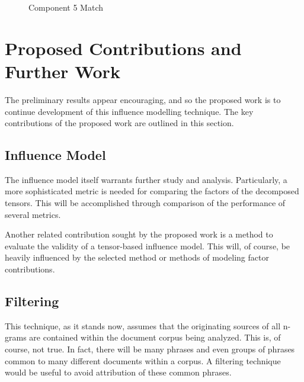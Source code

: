 \documentclass{article}
\begin{document}
\begin{figure}%
    \centering
    \qquad
    \caption{Component 5 Match}%
    \label{fig:com5}%
\end{figure}

\section{Proposed Contributions and Further Work}
The preliminary results appear encouraging, and so the proposed work
is to continue development of this influence modelling technique.  The
key contributions of the proposed work are outlined in this section.

\subsection{Influence Model}
The influence model itself warrants further study and analysis.
Particularly, a more sophisticated metric is needed for comparing the
factors of the decomposed tensors.  This will be accomplished through
comparison of the performance of several metrics.

Another related contribution sought by the proposed work is a method
to evaluate the validity of a tensor-based influence model.  This
will, of course, be heavily influenced by the selected method or
methods of modeling factor contributions.

\subsection{Filtering}
This technique, as it stands now, assumes that the originating sources
of all n-grams are contained within the document corpus being
analyzed. This is, of course, not true.  In fact, there will be many
phrases and even groups of phrases common to many different documents
within a corpus.  A filtering technique would be useful to avoid
attribution of these common phrases.
\end{document}
